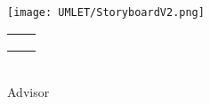 
\settowidth{\unitlength}{\titleMain}

\begin{titlingpage}
\centering

{
	\color{LightGoldenrod}
	\resizebox*{\unitlength}{\baselineskip}{\rotateright{$\}$}}
} \\ [\baselineskip]

{
	\color{Sienna}
	\titleMain
} \\ [\baselineskip]


{
	\color{RosyBrown}
	\titleSemester \\
}

{
	\color{LightGoldenrod}
	\resizebox*{\unitlength}{\baselineskip}{\rotateleft{$\}$}}
}

\vfill

\texttt{[image: UMLET/StoryboardV2.png]}

\vfill

\begin{tabu} to \linewidth {X[1,c] X[1,c]}
\authorOneName						& \authorTwoName \\
\authorOneID						& \authorTwoID \\
									& \\
\end{tabu} \\ [2\baselineskip]

{
	{\Large Advisor} \\
	\advisorName
}

\end{titlingpage}
